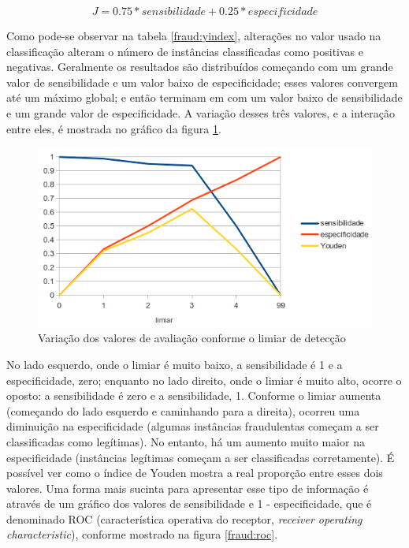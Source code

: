 \vspace{2mm}
\begin{equation}
    J = 0.75 * sensibilidade + 0.25 * especificidade
\end{equation}
\vspace{2mm}

Como pode-se observar na tabela \ref{fraud:yindex}, alterações no valor usado na classificação alteram o número de instâncias classificadas como positivas e negativas. Geralmente os resultados são distribuídos começando com um grande valor de sensibilidade e um valor baixo de especificidade; esses valores convergem até um máximo global; e então terminam em com um valor baixo de sensibilidade e um grande valor de especificidade. A variação desses três valores, e a interação entre eles, é mostrada no gráfico da figura \ref{fraud:threshold}.

\begin{figure}[h!]
\centering
\includegraphics[scale=0.5]{img/threshold.png}
\caption{Variação dos valores de avaliação conforme o limiar de detecção}
\label{fraud:threshold}
\end{figure}

No lado esquerdo, onde o limiar é muito baixo, a sensibilidade é 1 e a especificidade, zero; enquanto no lado direito, onde o limiar é muito alto, ocorre o oposto: a sensibilidade é zero e a sensibilidade, 1. Conforme o limiar aumenta (começando do lado esquerdo e caminhando para a direita), ocorreu uma diminuição na especificidade (algumas instâncias fraudulentas começam a ser classificadas como legítimas). No entanto, há um aumento muito maior na especificidade (instâncias legítimas começam a ser classificadas corretamente). É possível ver como o índice de Youden mostra a real proporção entre esses dois valores. Uma forma mais sucinta para apresentar esse tipo de informação é através de um gráfico dos valores de sensibilidade e 1 - especificidade, que é denominado ROC (característica operativa do receptor, \emph{receiver operating characteristic}), conforme mostrado na figura \ref{fraud:roc}.

